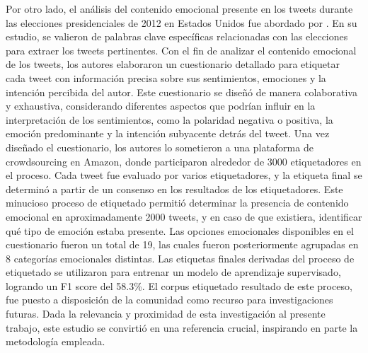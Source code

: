 Por otro lado, el análisis del contenido emocional presente en los tweets durante las elecciones presidenciales de 2012 en Estados Unidos fue abordado por \cite{mohammad2015sentiment}. En su estudio, se valieron de palabras clave específicas relacionadas con las elecciones para extraer los tweets pertinentes. Con el fin de analizar el contenido emocional de los tweets, los autores elaboraron un cuestionario detallado para etiquetar cada tweet con información precisa sobre sus sentimientos, emociones y la intención percibida del autor. Este cuestionario se diseñó de manera colaborativa y exhaustiva, considerando diferentes aspectos que podrían influir en la interpretación de los sentimientos, como la polaridad negativa o positiva, la emoción predominante y la intención subyacente detrás del tweet. Una vez diseñado el cuestionario, los autores lo sometieron a una plataforma de crowdsourcing en Amazon, donde participaron alrededor de 3000 etiquetadores en el proceso. Cada tweet fue evaluado por varios etiquetadores, y la etiqueta final se determinó a partir de un consenso en los resultados de los etiquetadores. Este minucioso proceso de etiquetado permitió determinar la presencia de contenido emocional en aproximadamente 2000 tweets, y en caso de que existiera, identificar qué tipo de emoción estaba presente. Las opciones emocionales disponibles en el cuestionario fueron un total de 19, las cuales fueron posteriormente agrupadas en 8 categorías emocionales distintas. Las etiquetas finales derivadas del proceso de etiquetado se utilizaron para entrenar un modelo de aprendizaje supervisado, logrando un F1 score del 58.3\%. El corpus etiquetado resultado de este proceso, fue puesto a disposición de la comunidad como recurso para investigaciones futuras. Dada la relevancia y proximidad de esta investigación al presente trabajo, este estudio se convirtió en una referencia crucial, inspirando en parte la metodología empleada.












